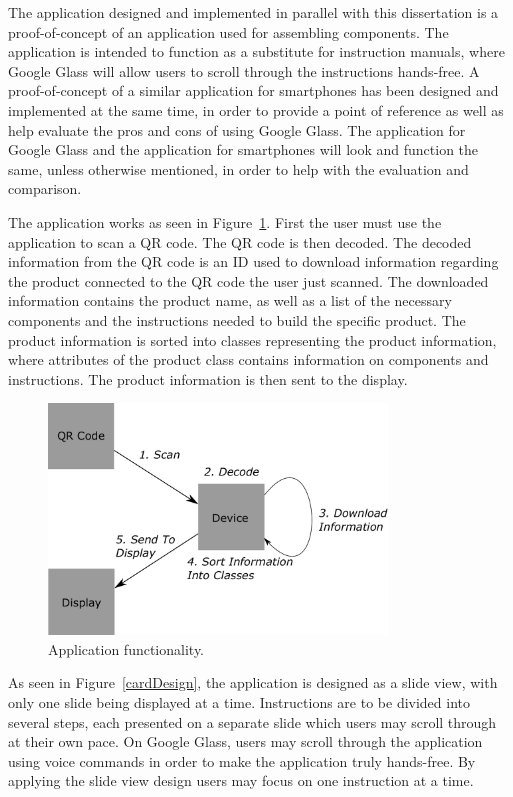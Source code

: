 The application designed and implemented in parallel with this dissertation is a proof-of-concept of an application used for assembling components. The application is intended to function as a substitute for  instruction manuals, where Google Glass will allow users to scroll through the instructions hands-free. A proof-of-concept of a similar application for smartphones has been designed and implemented at the same time, in order to provide a point of reference as well as help evaluate the pros and cons of using Google Glass. The application for Google Glass and the application for smartphones will look and function the same, unless otherwise mentioned, in order to help with the evaluation and comparison.

The application works as seen in Figure~\ref{projectmap}. First the user must use the application to scan a QR code. The QR code is then decoded. The decoded information from the QR code is an ID used to download information regarding the product connected to the QR code the user just scanned. The downloaded information contains the product name, as well as a list of the necessary components and the instructions needed to build the specific product. The product information is sorted into classes representing the product information, where attributes of the product class contains information on components and instructions.  The product information is then sent to the display.

	\begin{figure}[ht!]
		\centering
		\includegraphics[width=90mm]{images/projectmap4}
		\caption{Application functionality.}
		\label{projectmap}
	\end{figure}

As seen in Figure~\ref{cardDesign}, the application is designed as a slide view, with only one slide being displayed at a time. Instructions are to be divided into several steps, each presented on a separate slide which users may scroll through at their own pace. On Google Glass, users may scroll through the application using voice commands in order to make the application truly hands-free. By applying the slide view design users may focus on one instruction at a time. %

